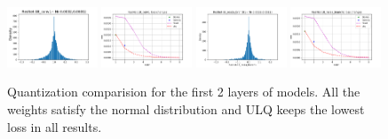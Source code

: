 \begin{figure}[!ht]
\begin{minipage}[t]{1\textwidth}
            \includegraphics[width=0.24\textwidth]{ActualWeights/Resnet-18/conv1/Distribution.pdf}
            \includegraphics[width=0.24\textwidth]{ActualWeights/Resnet-18/conv1/LossWithWidth.pdf}
            \includegraphics[width=0.24\textwidth]{ActualWeights/Resnet-18/branch1/Distribution.pdf}
            \includegraphics[width=0.24\textwidth]{ActualWeights/Resnet-18/branch1/LossWithWidth.pdf}
    \end{minipage}
    \caption{Quantization comparision for the first 2 layers of models. All the weights satisfy the normal distribution and ULQ keeps the lowest loss in all results.}
    \label{fig:quantization_for_actualweights}
\end{figure}